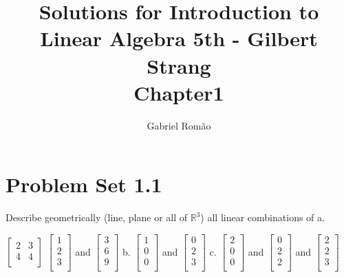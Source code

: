 \documentclass{report}
\title{\Huge{Solutions for Introduction to Linear Algebra 5th -
Gilbert Strang}\\ Chapter1 }
\author{\huge{Gabriel Romão}}
\date{}
\begin{document}
\maketitle
\newpage

\tableofcontents

\chapter{Problem Set 1.1}

\begin{question}{Describe geometrically (line, plane or all of
    $\mathbb{R}^3$) all linear combinations of }{}
    a.

    $
    \begin{bmatrix}
        2 & 3\\
        4 & 4\\
    \end{bmatrix}
    $
    $
    \begin{bmatrix}
        1\\
        2\\
        3\\
    \end{bmatrix}
    $
    and
    $
    \begin{bmatrix}
        3\\
        6\\
        9\\
    \end{bmatrix}
    $
    b.
    $
    \begin{bmatrix}
        1\\
        0\\
        0\\
    \end{bmatrix}
    $
    and
    $
    \begin{bmatrix}
        0\\
        2\\
        3\\
    \end{bmatrix}
    $
    c.
    $
    \begin{bmatrix}
        2\\
        0\\
        0\\
    \end{bmatrix}
    $
    and
    $
    \begin{bmatrix}
        0\\
        2\\
        2\\
    \end{bmatrix}
    $
    and
    $
    \begin{bmatrix}
        2\\
        2\\
        3\\
    \end{bmatrix}
    $

\end{question}
\end{document}
